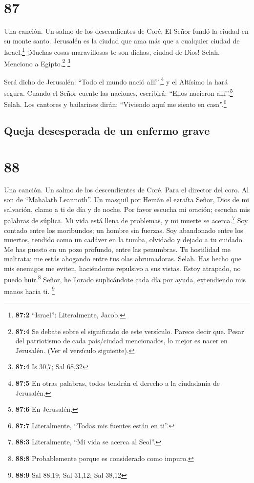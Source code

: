 \hypertarget{section-86}{%
\section{87}\label{section-86}}

Una canción. Un salmo de los descendientes de Coré.  El
Señor fundó la ciudad en su monte santo.  Jerusalén es la
ciudad que ama más que a cualquier ciudad de Israel.\footnote{\textbf{87:2}
  ``Israel'': Literalmente, Jacob.}  ¡Muchas cosas
maravillosas te son dichas, ciudad de Dios! Selah. 
Menciono a Egipto.\footnote{\textbf{87:4} Se debate sobre el significado
  de este versículo. Parece decir que. Pesar del patriotismo de cada
  país/ciudad mencionados, lo mejor es nacer en Jerusalén. (Ver el
  versículo siguiente).} \footnote{\textbf{87:4} Is 30,7; Sal 68,32}

 Será dicho de Jerusalén: ``Todo el mundo nació
allí'',\footnote{\textbf{87:5} En otras palabras, todos tendrán el
  derecho a la ciudadanía de Jerusalén.} y el Altísimo la hará segura.
 Cuando el Señor cuente las naciones, escribirá: ``Ellos
nacieron allí''.\footnote{\textbf{87:6} En Jerusalén.} Selah.
 Los cantores y bailarines dirán: ``Viviendo aquí me
siento en casa''.\footnote{\textbf{87:7} Literalmente, ``Todas mis
  fuentes están en ti''.}

\hypertarget{queja-desesperada-de-un-enfermo-grave}{%
\subsection{Queja desesperada de un enfermo
grave}\label{queja-desesperada-de-un-enfermo-grave}}

\hypertarget{section-87}{%
\section{88}\label{section-87}}

Una canción. Un salmo de los descendientes de Coré. Para el director del
coro. Al son de ``Mahalath Leannoth''. Un masquil por Hemán el ezraíta
 Señor, Dios de mi salvación, clamo a ti de día y de
noche.  Por favor escucha mi oración; escucha mis palabras
de súplica.  Mi vida está llena de problemas, y mi muerte
se acerca.\footnote{\textbf{88:3} Literalmente, ``Mi vida se acerca al
  Seol''.}  Soy contado entre los moribundos; un hombre
sin fuerzas.  Soy abandonado entre los muertos, tendido
como un cadáver en la tumba, olvidado y dejado a tu cuidado.
 Me has puesto en un pozo profundo, entre las penumbras.
 Tu hostilidad me maltrata; me estás ahogando entre tus
olas abrumadoras. Selah.  Has hecho que mis enemigos me
eviten, haciéndome repulsivo a sus vistas. Estoy atrapado, no puedo
huir.\footnote{\textbf{88:8} Probablemente porque es considerado como
  impuro.}  Señor, he llorado suplicándote cada día por
ayuda, extendiendo mis manos hacia ti. \footnote{\textbf{88:9} Sal
  88,19; Sal 31,12; Sal 38,12}

